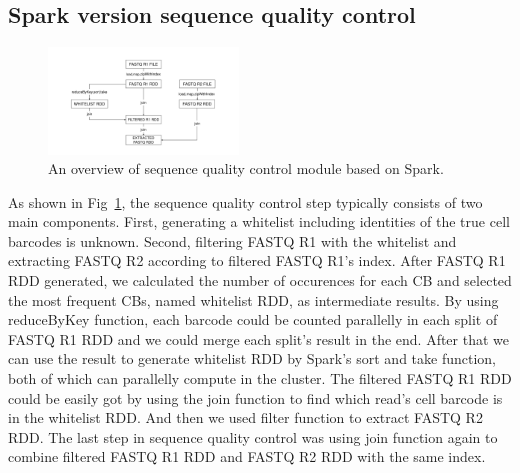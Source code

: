 \documentclass[conference]{IEEEtran}
\begin{document}
\subsection{Spark version sequence quality control}
\begin{figure}
	\includegraphics[width=0.45\textwidth]{Fig1.pdf}
	\caption{An overview of sequence quality control module based on Spark.} \label{fig1}
\end{figure}
As shown in Fig~\ref{fig1}, the sequence quality control step typically consists of two main components.
First, generating a whitelist including identities of the true cell barcodes is unknown.
Second, filtering FASTQ R1 with the whitelist and extracting FASTQ R2 according to filtered FASTQ R1's index.
After FASTQ R1 RDD generated, we calculated the number of occurences for each CB and selected the most frequent CBs, named whitelist RDD, as intermediate results. 
By using reduceByKey function, each barcode could be counted parallelly in each split of FASTQ R1 RDD and we could merge each split's result in the end. 
After that we can use the result to generate whitelist RDD by Spark's sort and take function, both of which can parallelly compute in the cluster. 
The filtered FASTQ R1 RDD could be easily got by using the join function to find which read's cell barcode is in the whitelist RDD.
And then we used filter function to extract FASTQ R2 RDD. 
The last step in sequence quality control was using join function again to combine filtered FASTQ R1 RDD and FASTQ R2 RDD with the same index. 
\end{document}
